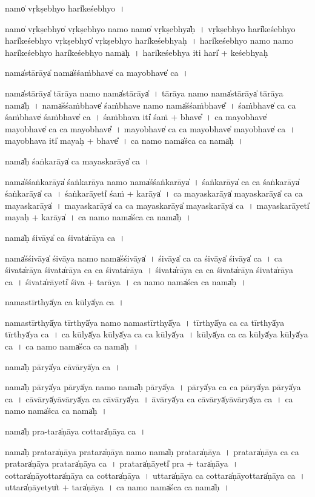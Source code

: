 \documentclass[parskip, DIV=14]{scrartcl}
\begin{document}
{namo̍ vṛ॒kṣebhyo॒ hari̍keśebhyo॒~।

namo̍ vṛ॒kṣebhyo̍ vṛ॒kṣebhyo॒ namo॒ namo̍ vṛ॒kṣebhya̍ḥ~।
vṛ॒kṣebhyo॒ hari̍keśebhyo॒ hari̍keśebhyo vṛ॒kṣebhyo̍ vṛ॒kṣebhyo॒ hari̍keśebhyaḥ~।
hari̍keśebhyo॒  namo॒ namo॒ hari̍keśebhyo॒ hari̍keśebhyo॒ nama̍ḥ~।
hari̍keśebhya॒ iti॒ hari̍ + ke॒śe॒bhya॒ḥ

nama̍stā॒rāya̍ nama̍śśa॒ṁbhave̍ ca mayo॒bhave̍ ca॒~।

nama̍stā॒rāya̍ tā॒rāya॒ namo॒ nama̍stā॒rāya̍~।
tā॒rāya॒ namo॒ nama̍stā॒rāya̍ tā॒rāya॒ nama̍ḥ~।
nama̍śśa॒ṁbhave̍ śa॒ṁbhave॒ namo॒ nama̍śśa॒ṁbhave̎~।
śa॒ṁbhave̍ ca ca śa॒ṁbhave̍ śa॒ṁbhave̍ ca~।
śa॒ṁbhava॒ iti̍ śaṁ + bhave̎~।
ca॒ ma॒yo॒bhave̍ mayo॒bhave̍ ca ca mayo॒bhave̎~।
ma॒yo॒bhave̍ ca ca mayo॒bhave̍ mayo॒bhave̍ ca~।
ma॒yo॒bhava॒ iti̍ mayaḥ + bhave̎~।
ca॒ namo॒ nama̍śca ca॒ nama̍ḥ~।

nama̍ḥ śaṅka॒rāya̍ ca mayaska॒rāya̍ ca॒~।

nama̍śśaṅka॒rāya̍ śaṅka॒rāya॒ namo॒ nama̍śśaṅka॒rāya̍~। 
śa॒ṅka॒rāya̍ ca ca śaṅka॒rāya̍ śaṅka॒rāya̍ ca~। 
śa॒ṅka॒rāyeti̍ śaṁ + ka॒rāya̍~। 
ca॒ ma॒ya॒ska॒rāya̍ mayaska॒rāya̍ ca ca mayaska॒rāya̍~।
ma॒ya॒ska॒rāya̍ ca ca mayaska॒rāya̍ mayaska॒rāya̍ ca~।
ma॒ya॒ska॒rāyeti̍ mayaḥ + ka॒rāya̍~।
ca॒ namo॒ nama̍śca ca॒ nama̍ḥ~।

nama̍ḥ śi॒vāya̍ ca śi॒vata̍rāya ca॒~।

nama̍śśi॒vāya̍ śi॒vāya॒ namo॒ nama̍śśi॒vāya̍~।
śi॒vāya̍ ca ca śi॒vāya̍ śi॒vāya̍ ca~।
ca॒ śi॒vata̍rāya śi॒vata̍rāya ca ca śi॒vata̍rāya~।
śi॒vata̍rāya ca ca śi॒vata̍rāya śi॒vata̍rāya ca~।
śi॒vata̍rā॒yeti̍ śi॒va + ta॒rā॒ya॒~।
ca॒ namo॒ nama̍śca ca॒ nama̍ḥ~।

nama॒stīrthyā̍ya ca॒ kūlyā̍ya ca॒~।

nama॒stīrthyā̍ya॒ tīrthyā̍ya॒ namo॒ nama॒stīrthyā̍ya~।
tīrthyā̍ya ca ca॒ tīrthyā̍ya॒ tīrthyā̍ya ca~।
ca॒ kūlyā̍ya॒ kūlyā̍ya ca ca॒ kūlyā̍ya~।
kūlyā̍ya ca ca॒ kūlyā̍ya॒ kūlyā̍ya ca~।
ca॒ namo॒ nama̍śca ca॒ nama̍ḥ~।

nama̍ḥ pā॒ryā̍ya cāvā॒ryā̍ya ca॒~।

nama̍ḥ pā॒ryā̍ya pā॒ryā̍ya॒ namo॒ nama̍ḥ pā॒ryā̍ya~।
pā॒ryā̍ya ca ca pā॒ryā̍ya pā॒ryā̍ya ca~।
cā॒vā॒ryā̍yāvā॒ryā̍ya ca cāvā॒ryā̍ya~।
ā॒vā॒ryā̍ya ca cāvā॒ryā̍yāvā॒ryā̍ya ca~।
ca॒ namo॒ nama̍śca ca॒ nama̍ḥ~।

nama̍ḥ pra॒-tara̍ṇāya co॒ttara̎ṇāya ca॒~।

nama̍ḥ pra॒tara̍ṇāya pra॒tara̍ṇāya॒ namo॒ nama̍ḥ pra॒tara̍ṇāya~।
pra॒tara̍ṇāya ca ca  pra॒tara̍ṇāya pra॒tara̍ṇāya ca~।
pra॒tara̍ṇā॒yeti̍ pra + tara̍ṇāya~।
co॒ttara̍ṇāyo॒ttara̍ṇāya ca co॒ttara̍ṇāya~।
u॒ttara̍ṇāya ca co॒ttara̍ṇāyo॒ttara̍ṇāya ca~।
u॒ttara̍ṇā॒yetyu̍t + tara̍ṇāya~।
ca॒ namo॒ nama̍śca ca॒ nama̍ḥ~।

}
\end{document}
